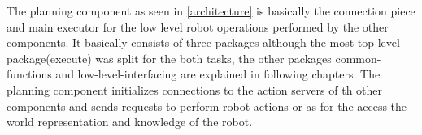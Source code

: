 \documentclass[main.tex]{subfiles}
\begin{document}
			The planning component as seen in \ref{architecture} is basically the connection piece and main executor for the low level robot operations performed by the other components. It basically consists of three packages although the most top level package(execute) was split for the both tasks, the other packages common-functions and low-level-interfacing are explained in following chapters. The planning component initializes connections to the action servers of th other components and sends requests to perform robot actions or as for the access the world representation and knowledge of the robot.
	  		 

	\endgroup
\end{document}
